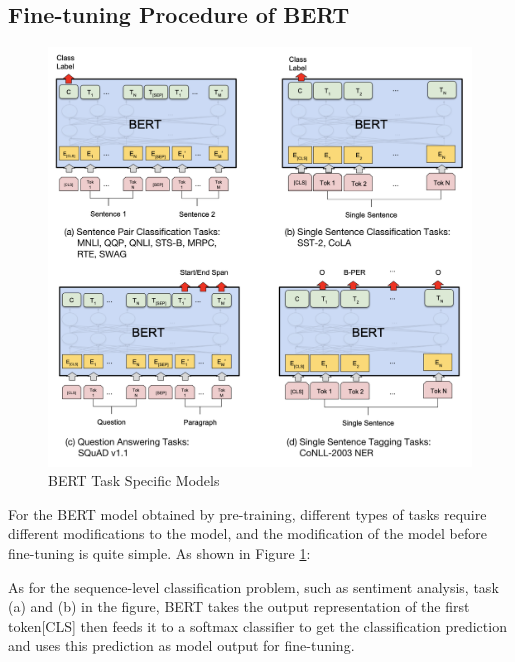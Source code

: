 \documentclass[]{krantz}
\begin{document}
\hypertarget{fine-tuning-procedure-of-bert}{%
\subsection{Fine-tuning Procedure of BERT}\label{fine-tuning-procedure-of-bert}}

\begin{figure}

{\centering \includegraphics[width=0.6\linewidth]{figures/02-03-transfer-learning-for-nlp/bert_based_model} 

}

\caption{BERT Task Specific Models}\label{fig:ch02-03-figure05}
\end{figure}

For the BERT model obtained by pre-training, different types of tasks require different modifications to the model, and the modification of the model before fine-tuning is quite simple. As shown in Figure \ref{fig:ch02-03-figure05}:

As for the sequence-level classification problem, such as sentiment analysis, task (a) and (b) in the figure, BERT takes the output representation of the first token{[}CLS{]} then feeds it to a softmax classifier to get the classification prediction and uses this prediction as model output for fine-tuning.
\end{document}
